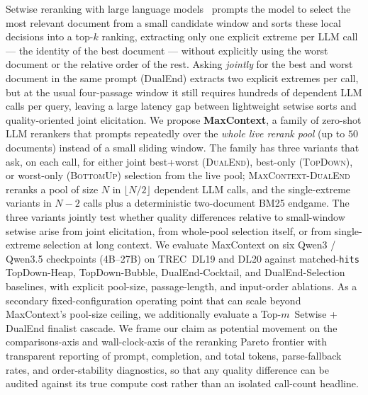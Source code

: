 Setwise reranking with large language models~\citep{zhuang2024setwise} prompts
the model to select the most relevant document from a small candidate window
and sorts these local decisions into a top-$k$ ranking, extracting only one
explicit extreme per LLM call --- the identity of the best document --- without
explicitly using the worst document or the relative order of the rest. Asking
\emph{jointly} for the best and worst document in the same prompt (DualEnd)
extracts two explicit extremes per call, but at the usual four-passage window
it still requires hundreds of dependent LLM calls per query, leaving a large
latency gap between lightweight setwise sorts and quality-oriented joint
elicitation.
We propose \textbf{MaxContext}, a family of zero-shot LLM rerankers that
prompts repeatedly over the \emph{whole live rerank pool} (up to $50$
documents) instead of a small sliding window. The family has three variants
that ask, on each call, for either joint best+worst (\textsc{DualEnd}),
best-only (\textsc{TopDown}), or worst-only (\textsc{BottomUp}) selection from
the live pool; \textsc{MaxContext-DualEnd} reranks a pool of size $N$ in
$\lfloor N/2 \rfloor$ dependent LLM calls, and the single-extreme variants in
$N{-}2$ calls plus a deterministic two-document BM25 endgame. The three
variants jointly test whether quality differences relative to small-window
setwise arise from joint elicitation, from whole-pool selection itself, or
from single-extreme selection at long context. We evaluate MaxContext on six
Qwen3 / Qwen3.5 checkpoints (4B--27B) on TREC~DL19 and DL20 against
matched-\texttt{hits} TopDown-Heap, TopDown-Bubble, DualEnd-Cocktail, and
DualEnd-Selection baselines, with explicit pool-size, passage-length, and
input-order ablations. As a secondary fixed-configuration operating point that can scale beyond
MaxContext's pool-size ceiling, we additionally evaluate a Top-$m$~Setwise
+ DualEnd finalist cascade. We frame
our claim as potential movement on the comparisons-axis and wall-clock-axis of
the reranking Pareto frontier with transparent reporting of prompt,
completion, and total tokens, parse-fallback rates, and order-stability
diagnostics, so that any quality difference can be audited against its true
compute cost rather than an isolated call-count headline.
